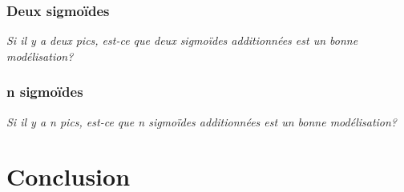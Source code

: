 \documentclass{article}
\begin{document}
\subsubsection{ Deux sigmoïdes}
\textit{Si il y a deux pics, est-ce que deux sigmoïdes additionnées est un bonne modélisation?}

\subsubsection{n sigmoïdes}
\textit{Si il y a n pics, est-ce que n sigmoïdes additionnées est un bonne modélisation?}

\section{Conclusion}
\end{document}
